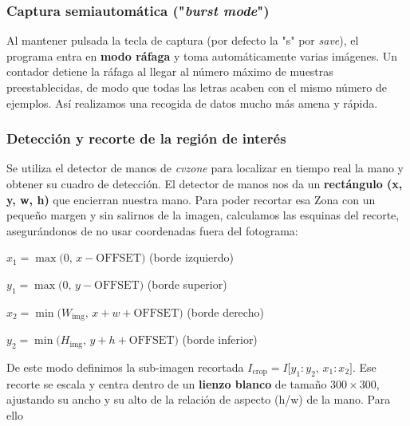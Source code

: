 \subsubsection{Captura semiautomática ("\textit{burst mode}")}
Al mantener pulsada la tecla de captura (por defecto la "s" por \textit{save}), el programa entra en \textbf{modo ráfaga} y toma automáticamente varias imágenes. Un contador detiene la ráfaga al llegar al número máximo de muestras preestablecidas, de modo que todas las letras acaben con el mismo número de ejemplos. Así realizamos una recogida de datos mucho más amena y rápida.

\subsubsection{Detección y recorte de la región de interés}
Se utiliza el detector de manos de \textit{cvzone} para localizar en tiempo real la mano y obtener su cuadro de detección. El detector de manos nos da un \textbf{rectángulo (x, y, w, h)} que encierran nuestra mano. Para poder recortar esa Zona con un pequeño margen y sin salirnos de la imagen, calculamos las esquinas del recorte, asegurándonos de no usar coordenadas fuera del fotograma:\newline
    
      $x_{1}=\max\bigl(0,\,x-\mathrm{OFFSET}\bigr)$ (borde izquierdo)
    
      $y_{1}=\max\bigl(0,\,y-\mathrm{OFFSET}\bigr)$ (borde superior)
        
      $x_{2}=\min\bigl(W_{\mathrm{img}},\,x+w+\mathrm{OFFSET}\bigr)$ (borde derecho)
    
      $y_{2}=\min\bigl(H_{\mathrm{img}},\,y+h+\mathrm{OFFSET}\bigr)$ (borde inferior)

    
De este modo definimos la sub-imagen recortada $ I_{\mathrm{crop}}=I\bigl[y_{1}:y_{2},\,x_{1}:x_{2}\bigr]$. Ese recorte se escala y centra dentro de un \textbf{lienzo blanco} de tamaño $300\times300$, ajustando su ancho y su alto de la relación de aspecto (h/w) de la mano. Para ello

